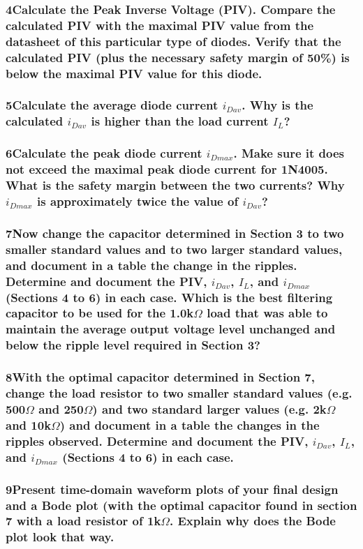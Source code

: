 \documentclass[]{article}
\begin{document}
{	\subsubsection*{4\indent Calculate the Peak Inverse Voltage (PIV). Compare the calculated PIV with the maximal PIV value from the datasheet of this particular type of diodes. Verify that the calculated PIV (plus the necessary safety margin of 50\%) is below the maximal PIV value for this diode.}
	{
	}

	\subsubsection*{5\indent Calculate the average diode current $i_{Dav}$. Why is the calculated $i_{Dav}$ is higher than the load current $I_L$?}
	{
	}
	
	\subsubsection*{6\indent Calculate the peak diode current $i_{Dmax}$. Make sure it does not exceed the maximal peak diode current for 1N4005. What is the safety margin between the two currents? Why $i_{Dmax}$ is approximately twice the value of $i_{Dav}$?}
	{
	}

	\subsubsection*{7\indent Now change the capacitor determined in Section 3 to two smaller standard values and to two larger standard values, and document in a table the change in the ripples. Determine and document the PIV, $i_{Dav}$, $I_L$, and $i_{Dmax}$ (Sections 4 to 6) in each case. Which is the best filtering capacitor to be used for the 1.0k$\Omega$ load that was able to maintain the average output voltage level unchanged and below the ripple level required in Section 3?}
	{
	}

	\subsubsection*{8\indent With the optimal capacitor determined in Section 7, change the load resistor to two smaller standard values (e.g. 500$\Omega$ and 250$\Omega$) and two standard larger values (e.g. 2k$\Omega$ and 10k$\Omega$) and document in a table the changes in the ripples observed. Determine and document the PIV, $i_{Dav}$, $I_L$, and $i_{Dmax}$ (Sections 4 to 6) in each case.}
	{
	}

	\subsubsection*{9\indent Present time-domain waveform plots of your final design and a Bode plot (with the optimal capacitor found in section 7 with a load resistor of 1k$\Omega$. Explain why does the Bode plot look that way.}
	{
	}
}
\end{document}
